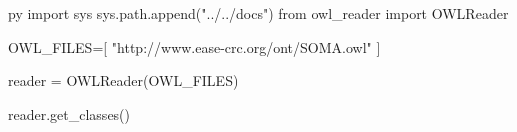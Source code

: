 \documentclass{article}
\begin{document}
\begin{pythontexcustomcode}{py}
import sys
sys.path.append("../../docs")
from owl_reader import OWLReader

OWL_FILES=[
    "http://www.ease-crc.org/ont/SOMA.owl"
]

reader = OWLReader(OWL_FILES)
\end{pythontexcustomcode}

\begin{multicols}{2}

\begin{pycode}
reader.get_classes()
\end{pycode}

\end{multicols}
\end{document}
